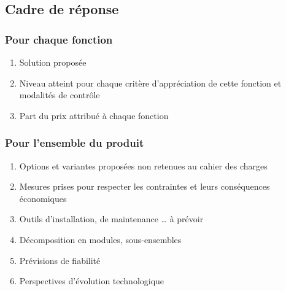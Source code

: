 \subsection{Cadre de réponse}

\subsubsection{Pour chaque fonction}
\begin{enumerate}
\item{Solution proposée}
\item{Niveau atteint pour chaque critère d’appréciation de cette fonction et modalités de contrôle}
\item{Part du prix attribué à chaque fonction}
\end{enumerate}

\subsubsection{Pour l’ensemble du produit}
\begin{enumerate}
\item{Options et variantes proposées non retenues au cahier des charges}
\item{Mesures prises pour respecter les contraintes et leurs conséquences économiques}

\item{Outils d’installation, de maintenance … à prévoir}
\item{Décomposition en modules, sous-ensembles}
\item{Prévisions de fiabilité}
\item{ Perspectives d’évolution technologique}
\end{enumerate}